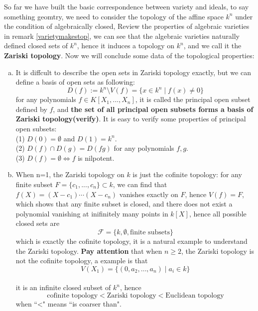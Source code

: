 So far we have built the basic correspondence between variety and ideals, to say something geomtry, we need to consider the topology of the affine space \(k^n\) under the condition of algebraically closed, Review the properties of algebraic varieties in remark \ref{varietymakestop}, we can see that the algebraic varieties naturally defined closed sets of \(k^n\), hence it induces a topology on \(k^n\), and we call it the \textbf{Zariski topology}. Now we will conclude some data of the topological properties:

\begin{enumerate}[(a)]
    \item It is diffcult to describe the open sets in Zariski topology exactly, but we can define a basis of open sets as following:
    \[D(f) := k^n \setminus V(f) = \{x \in k^n \mid f(x) \neq 0\}\]
    for any polynomials \(f \in K[X_1,...,X_n]\), it is called the principal open subset defined by \(f\), and \textbf{the set of all principal open subsets forms a basis of Zariski topology(verify)}. It is easy to verify some properties of principal open subsets:\\
    (1) \(D(0) = \emptyset\) and \(D(1) = k^n\).\\
    (2) \(D(f) \cap D(g) = D(fg)\) for any polynomials \(f,g\).\\
    (3) \(D(f) = \emptyset \iff f\) is nilpotent.\\

    \item When n=1, the Zariski topology on \(k\) is just the cofinite topology: for any finite subset \(F = \{c_1,...,c_n\}\subset k\), we can find that \(f(X) = (X-c_1)\cdots(X-c_n)\) vanishes exactly on \(F\), hence \(V(f) = F\), which shows that any finite subset is closed, and there does not exist a polynomial vanishing at inifinitely many points in \(k[X]\), hence all possible closed sets are
    \[\mathcal{F} = \{k,\emptyset,\text{finite subsets}\}\]
    which is exactly the cofinite topology, it is a natural example to understand the Zariski topology. \textbf{Pay attention} that when \(n\geq 2\), the Zariski topology is not the cofinite topology, a example is that 
    \[V(X_1) = \{(0,a_2,\dots,a_n) \mid a_i \in k\}\]\\
    it is an infinite closed subset of \(k^n\), hence 
    \[\text{cofinite topology} < \text{Zariski topology} < \text{Euclidean topology}\]
    when “<" means “is coarser than".\\


\end{enumerate}
